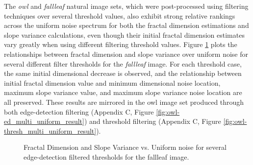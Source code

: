 \documentclass[12pt, oneside]{book}
\begin{document}
The \textit{owl} and \textit{fallleaf} natural image sets, which were post-processed using filtering techniques over several threshold values, also exhibit strong relative rankings across the uniform noise spectrum for both the fractal dimension estimations and slope variance calculations, even though their initial fractal dimension estimates vary greatly when using different filtering threshold values.  Figure \ref{fig:leaf_multi_uniform_result} plots the relationships between fractal dimension and slope variance over uniform noise for several different filter thresholds for the \textit{fallleaf} image.  For each threshold case, the same initial dimensional decrease is observed, and the relationship between initial fractal dimension value and minimum dimensional noise location, maximum slope variance value, and maximum slope variance noise location are all preserved. These results are mirrored in the owl image set produced through both edge-detection filtering (Appendix C, Figure \ref{fig:owl-ed_multi_uniform_result}) and threshold filtering (Appendix C, Figure \ref{fig:owl-thresh_multi_uniform_result}).

\begin{figure}[!b]
  \centering
  \caption[Fractal Dimension and Slope Variance vs. Uniform noise for several edge-detection filtered thresholds for the fallleaf image.]{Fractal Dimension and Slope Variance vs. Uniform noise for several edge-detection filtered thresholds for the fallleaf image.}
  \label{fig:leaf_multi_uniform_result}
\end{figure}
\end{document}
